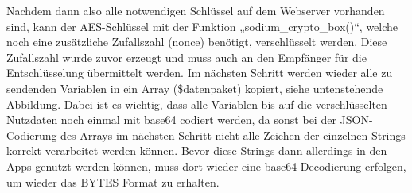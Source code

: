 Nachdem dann also alle notwendigen Schlüssel auf dem Webserver vorhanden sind, kann der AES-Schlüssel mit der Funktion „sodium\_crypto\_box()“, welche noch eine zusätzliche Zufallszahl (nonce) benötigt, verschlüsselt werden. Diese Zufallszahl wurde zuvor erzeugt und muss auch an den Empfänger für die Entschlüsselung übermittelt werden. Im nächsten Schritt werden wieder alle zu sendenden Variablen in ein Array (\$datenpaket) kopiert, siehe untenstehende Abbildung. Dabei ist es wichtig, dass alle Variablen bis auf die verschlüsselten Nutzdaten noch einmal mit base64 codiert werden, da sonst bei der JSON-Codierung des Arrays im nächsten Schritt nicht alle Zeichen der einzelnen Strings korrekt verarbeitet werden können. Bevor diese Strings dann allerdings in den Apps genutzt werden können, muss dort wieder eine base64 Decodierung erfolgen, um wieder das BYTES Format zu erhalten.

